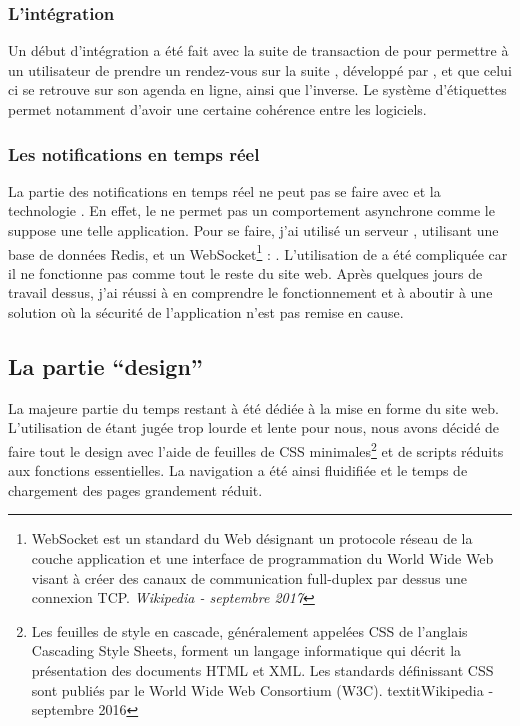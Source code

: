 \documentclass[a4paper, 11pt]{report}
\begin{document}
    \subsubsection*{L'intégration}
        Un début d'intégration a été fait avec la suite de transaction de \lgk pour permettre à un utilisateur de prendre un rendez-vous sur la suite \ulti, développé par \lgk, et que celui ci se retrouve sur son agenda en ligne, ainsi que l'inverse. Le système d'étiquettes permet notamment d'avoir une certaine cohérence entre les logiciels.

    \subsubsection*{Les notifications en temps réel}
        La partie des notifications en temps réel ne peut pas se faire avec \symfony et la technologie \php. En effet, le \php ne permet pas un comportement asynchrone comme le suppose une telle application. Pour se faire, j'ai utilisé un serveur \njs, utilisant une base de données Redis, et un WebSocket\footnote{WebSocket est un standard du Web désignant un protocole réseau de la couche application et une interface de programmation du World Wide Web visant à créer des canaux de communication full-duplex par dessus une connexion TCP. \textit{Wikipedia - septembre 2017}} : \io\cite{io}. L'utilisation de \io a été compliquée car il ne fonctionne pas comme tout le reste du site web. Après quelques jours de travail dessus, j'ai réussi à en comprendre le fonctionnement et à aboutir à une solution où la sécurité de l'application n'est pas remise en cause.


    \subsection{La partie ``design''}
    La majeure partie du temps restant à été dédiée à la mise en forme du site web. L'utilisation de \bootstrap\cite{bootstrap} étant jugée trop lourde et lente pour nous, nous avons décidé de faire tout le design avec l'aide de feuilles de CSS minimales\footnote{Les feuilles de style en cascade, généralement appelées CSS de l'anglais Cascading Style Sheets, forment un langage informatique qui décrit la présentation des documents HTML et XML. Les standards définissant CSS sont publiés par le World Wide Web Consortium (W3C). textit{Wikipedia - septembre 2016}} et de scripts \js\cite{js} réduits aux fonctions essentielles. La navigation a été ainsi fluidifiée et le temps de chargement des pages grandement réduit.
\end{document}

